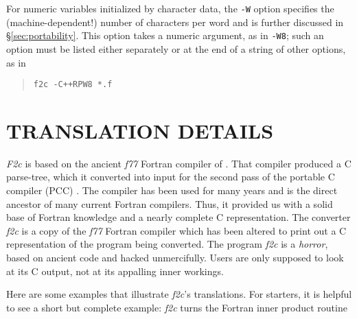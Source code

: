 \documentclass[10pt,a4paper]{article}
\begin{document}
\noindent
For numeric variables initialized by character data, the \verb|-W| option specifies the (machine-dependent!) number of characters per word and is further discussed in §\ref{sec:portability}. This option takes a numeric argument, as in \verb|-W8|; such an option must be listed either separately or at the end of a string of other options, as in
\begin{quote}
\begin{verbatim}
f2c -C++RPW8 *.f
\end{verbatim}
\end{quote}

\section{TRANSLATION DETAILS} \label{sec:translation}

\emph{F2c} is based on the ancient \emph{f77} Fortran compiler of \citep{6}. That compiler produced a C parse-tree, which it converted into input for the second pass of the portable C compiler (PCC) \citep{9}. The compiler has been used for many years and is the direct ancestor of many current Fortran compilers. Thus, it provided us with a solid base of Fortran knowledge and a nearly complete C representation. The converter \emph{f2c} is a copy of the \emph{f77} Fortran compiler which has been altered to print out a C representation of the program being converted. The program \emph{f2c} is a \emph{horror}, based on ancient code and hacked unmercifully. Users are only supposed to look at its C output, not at its appalling inner workings.

Here are some examples that illustrate \emph{f2c}’s translations. For starters, it is helpful to see a short but complete example: \emph{f2c} turns the Fortran inner product routine
\end{document}
